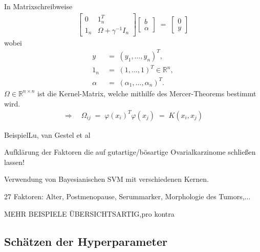 \documentclass{beamer}
\begin{document}
{\begin{frame}
	In Matrixschreibweise
	\begin{align}
		\begin{bmatrix}
			0& 1_n^T \\[0,5cm]
			1_n& \Omega+\gamma^{-1}I_n
		\end{bmatrix}
		\begin{bmatrix}
			b \\[0,2cm]
			\alpha
		\end{bmatrix}\;=\;
		\begin{bmatrix}
			0 \\[0,2cm] 
			y
		\end{bmatrix} 
	\end{align}
	wobei
	\begin{align}
		y &\;=\;(y_1,\dots,y_n)^T,\\
		1_n &\;=\;(1,\dots,1)^T\in\mathbb{R}^n,\\
		\alpha &\;=\;(\alpha_1,\dots,\alpha_n)^T.
	\end{align}
	$\Omega\in\mathbb{R}^{n\times n}$ ist die Kernel-Matrix, welche mithilfe des Mercer-Theorems bestimmt wird.\\
	\begin{align}
		\Rightarrow\quad\Omega_{ij} \;=\;\varphi(x_i)^T\varphi(x_j)\;=\;K(x_i,x_j)
	\end{align}
\end{frame}

\begin{frame}{Beispiel}{Lu, van Gestel et al}


Aufklärung der Faktoren die auf gutartige/bösartige Ovarialkarzinome schließen lassen!

Verwendung von Bayesianischen SVM mit verschiedenen Kernen.

27 Faktoren: Alter, Postmenopause, Serummarker, Morphologie des Tumors,...


MEHR BEISPIELE ÜBERSICHTSARTIG,pro kontra

\end{frame}




\subsection{Schätzen der Hyperparameter}

}
\end{document}
